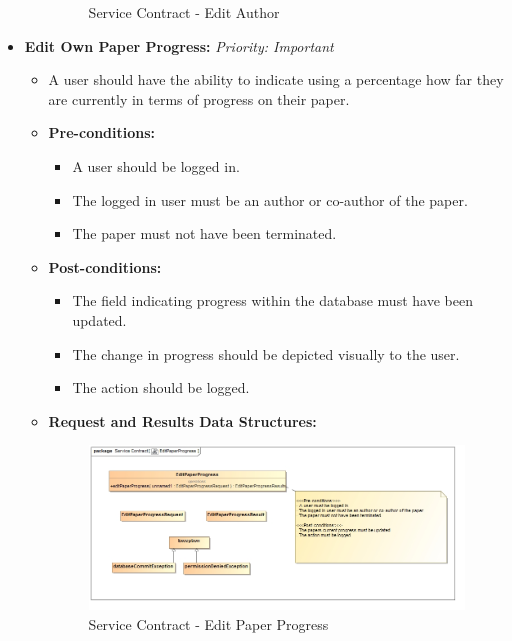 \documentclass{article}
\begin{document}
\begin{itemize}
\begin{itemize}
\begin{figure}[H]
							\caption{Service Contract - Edit Author}
						\end{figure}
					\end{itemize}
					
					\cleardoublepage
					\item \textbf{Edit Own Paper Progress:} \hfill \textit{Priority: Important}
					\begin{itemize}
						\item A user should have the ability to indicate using a percentage how far they are currently in terms of progress on their paper.
						\item \textbf{Pre-conditions:}
						\begin{itemize}
							\item A user should be logged in.
							\item The logged in user must be an author or co-author of the paper.
							\item The paper must not have been terminated.
						\end{itemize}
						\item \textbf{Post-conditions:}
						\begin{itemize}
							\item The field indicating progress within the database must have been updated.
							\item The change in progress should be depicted visually to the user.
							\item The action should be logged.
						\end{itemize}
						\item \textbf{Request and Results Data Structures:}
						\begin{figure}[H]
							\includegraphics[width=\linewidth]{../Diagrams/ServiceContracts/Publication subsystem/EditPaperProgress.jpg}
							\caption{Service Contract - Edit Paper Progress}
						\end{figure}
					\end{itemize}			
					

\end{itemize}
\end{document}
